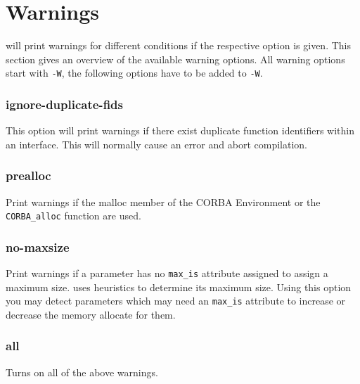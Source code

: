 \section{Warnings}
\dice{} will print warnings for different conditions if the respective
option is given. This section gives an overview of the available warning
options. All warning options start with \verb|-W|, the following options
have to be added to \verb|-W|.

\subsubsection{ignore-duplicate-fids}
This option will print warnings if there exist duplicate function identifiers
within an interface. This will normally cause an error and abort compilation.

\subsubsection{prealloc}
Print warnings if the malloc member of the CORBA Environment or the
\verb|CORBA_alloc| function are used.

\subsubsection{no-maxsize}
Print warnings if a parameter has no \verb|max_is| attribute assigned
to assign a maximum size. \dice{} uses heuristics to determine its
maximum size. Using this option you may detect parameters which may
need an \verb|max_is| attribute to increase or decrease the memory
allocate for them.

\subsubsection{all}
Turns on all of the above warnings.


